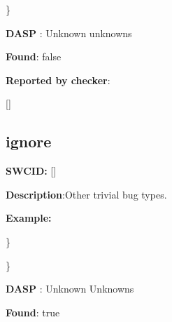 \documentclass{article}
\begin{document}
\} 

\textbf{DASP} : Unknown unknowns

\textbf{Found}: false

\textbf{Reported by checker}: 
\begin{ffcode} 

[]
\end{ffcode} 
\subsection{ignore} 
\textbf{SWC{\textunderscore}ID:} []

\textbf{Description}:Other trivial bug types.


\textbf{Example:} 
\begin{ffcode} 


\end{ffcode} 
\} 

\} 

\textbf{DASP} : Unknown Unknowns

\textbf{Found}: true
\end{document}
